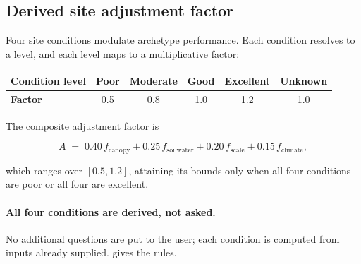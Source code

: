 \subsection{Derived site adjustment factor}
\label{sec:adjustment}

Four site conditions modulate archetype performance. Each condition resolves to
a level, and each level maps to a multiplicative factor:

\begin{center}
\small
\begin{tabular}{@{}lccccc@{}}
\toprule
\textbf{Condition level} & Poor & Moderate & Good & Excellent & Unknown \\
\midrule
\textbf{Factor} & 0.5 & 0.8 & 1.0 & 1.2 & 1.0 \\
\bottomrule
\end{tabular}
\end{center}

The composite adjustment factor is

\begin{equation}
\label{eq:adjustment}
A \;=\; 0.40\,f_{\mathrm{canopy}}
      + 0.25\,f_{\mathrm{soilwater}}
      + 0.20\,f_{\mathrm{scale}}
      + 0.15\,f_{\mathrm{climate}},
\end{equation}

which ranges over $[0.5, 1.2]$, attaining its bounds only when all four
conditions are poor or all four are excellent.

\paragraph{All four conditions are derived, not asked.} No additional questions
are put to the user; each condition is computed from inputs already supplied.
 gives the rules.

